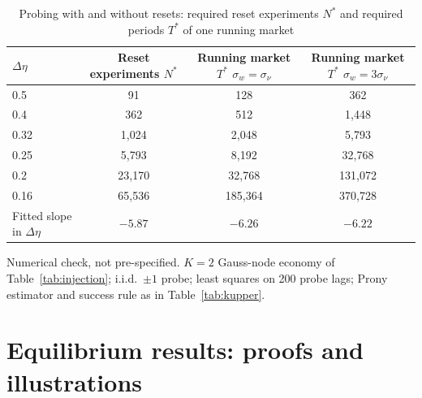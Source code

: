 \begin{table}[!htbp]\centering\small
\begin{threeparttable}
\caption{Probing with and without resets: required reset experiments $N^*$ and required periods $T^*$ of one running market}\label{tab:running}
\begin{tabular}{lccc}
\toprule
$\Delta\eta$ & Reset experiments $N^*$ & \shortstack{Running market $T^*$\\ $\sigma_w=\sigma_\nu$} & \shortstack{Running market $T^*$\\ $\sigma_w=3\sigma_\nu$}\\
\midrule
0.5 & 91 & 128 & 362\\
0.4 & 362 & 512 & 1{,}448\\
0.32 & 1{,}024 & 2{,}048 & 5{,}793\\
0.25 & 5{,}793 & 8{,}192 & 32{,}768\\
0.2 & 23{,}170 & 32{,}768 & 131{,}072\\
0.16 & 65{,}536 & 185{,}364 & 370{,}728\\
\midrule
Fitted slope in $\Delta\eta$ & $-5.87$ & $-6.26$ & $-6.22$\\
\bottomrule
\end{tabular}
\begin{tablenotes}\footnotesize\item Numerical check, not pre-specified. $K=2$ Gauss-node economy of Table~\ref{tab:injection}; i.i.d.\ $\pm1$ probe; least squares on 200 probe lags; Prony estimator and success rule as in Table~\ref{tab:kupper}.\end{tablenotes}
\end{threeparttable}
\end{table}

\section{Equilibrium results: proofs and illustrations}\label{app:eqinv}

